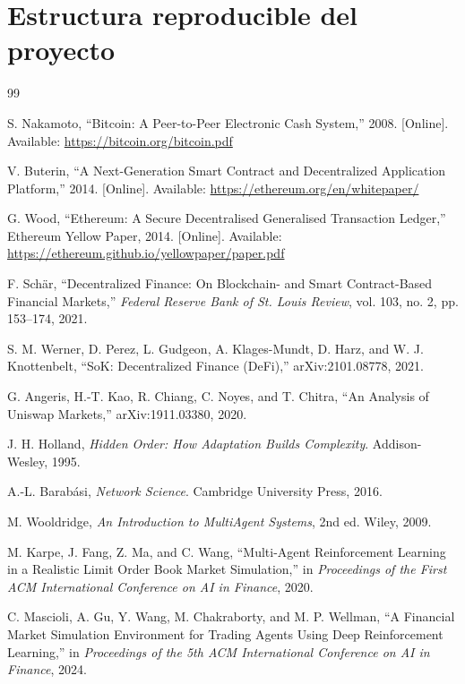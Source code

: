 \documentclass[12pt,oneside,letterpaper]{report}
\begin{document}
\appendix
\chapter{Estructura reproducible del proyecto}


\clearpage
{}
\begin{thebibliography}{99}

S. Nakamoto, ``Bitcoin: A Peer-to-Peer Electronic Cash System,'' 2008. [Online]. Available: \url{https://bitcoin.org/bitcoin.pdf}

V. Buterin, ``A Next-Generation Smart Contract and Decentralized Application Platform,'' 2014. [Online]. Available: \url{https://ethereum.org/en/whitepaper/}

G. Wood, ``Ethereum: A Secure Decentralised Generalised Transaction Ledger,'' Ethereum Yellow Paper, 2014. [Online]. Available: \url{https://ethereum.github.io/yellowpaper/paper.pdf}

F. Schär, ``Decentralized Finance: On Blockchain- and Smart Contract-Based Financial Markets,'' \textit{Federal Reserve Bank of St. Louis Review}, vol. 103, no. 2, pp. 153--174, 2021.

S. M. Werner, D. Perez, L. Gudgeon, A. Klages-Mundt, D. Harz, and W. J. Knottenbelt, ``SoK: Decentralized Finance (DeFi),'' arXiv:2101.08778, 2021.

G. Angeris, H.-T. Kao, R. Chiang, C. Noyes, and T. Chitra, ``An Analysis of Uniswap Markets,'' arXiv:1911.03380, 2020.

J. H. Holland, \textit{Hidden Order: How Adaptation Builds Complexity}. Addison-Wesley, 1995.

A.-L. Barabási, \textit{Network Science}. Cambridge University Press, 2016.

M. Wooldridge, \textit{An Introduction to MultiAgent Systems}, 2nd ed. Wiley, 2009.

M. Karpe, J. Fang, Z. Ma, and C. Wang, ``Multi-Agent Reinforcement Learning in a Realistic Limit Order Book Market Simulation,'' in \textit{Proceedings of the First ACM International Conference on AI in Finance}, 2020.

C. Mascioli, A. Gu, Y. Wang, M. Chakraborty, and M. P. Wellman, ``A Financial Market Simulation Environment for Trading Agents Using Deep Reinforcement Learning,'' in \textit{Proceedings of the 5th ACM International Conference on AI in Finance}, 2024.


\end{thebibliography}
\end{document}
